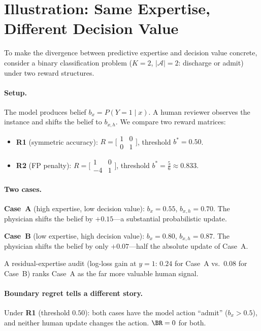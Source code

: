 \section{Illustration: Same Expertise, Different Decision Value}
\label{sec:illustration}

To make the divergence between predictive expertise and decision value concrete, consider a binary classification problem ($K = 2$, $|\mathcal{A}| = 2$: discharge or admit) under two reward structures.

\paragraph{Setup.}
The model produces belief $b_x = P(Y\!=\!1 \mid x)$.
A human reviewer observes the instance and shifts the belief to $b_{x,h}$.
We compare two reward matrices:
\begin{itemize}[nosep]
  \item \textbf{R1} (symmetric accuracy): $R = \bigl[\begin{smallmatrix}1&0\\0&1\end{smallmatrix}\bigr]$, threshold $b^* = 0.50$.
  \item \textbf{R2} (FP penalty): $R = \bigl[\begin{smallmatrix}1&0\\{-4}&1\end{smallmatrix}\bigr]$, threshold $b^* = \tfrac{5}{6} \approx 0.833$.
\end{itemize}

\paragraph{Two cases.}
\textbf{Case~A} (high expertise, low decision value): $b_x = 0.55$, $b_{x,h} = 0.70$.
The physician shifts the belief by $+0.15$---a substantial probabilistic update.

\textbf{Case~B} (low expertise, high decision value): $b_x = 0.80$, $b_{x,h} = 0.87$.
The physician shifts the belief by only $+0.07$---half the absolute update of Case~A.

A residual-expertise audit (log-loss gain at $y\!=\!1$: $0.24$ for Case~A vs.\ $0.08$ for Case~B) ranks Case~A as the far more valuable human signal.

\paragraph{Boundary regret tells a different story.}
Under \textbf{R1} (threshold $0.50$): both cases have the model action ``admit'' ($b_x > 0.5$), and neither human update changes the action.
$\BR = 0$ for both.

